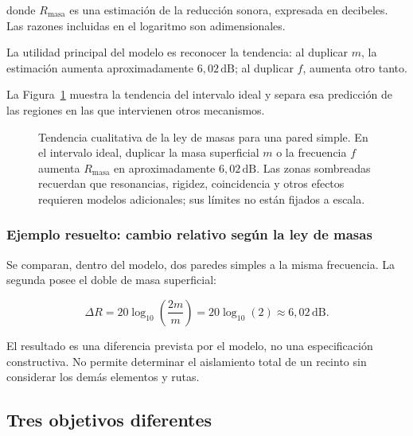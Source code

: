 donde \(R_\mathrm{masa}\) es una estimación de la reducción sonora, expresada
en decibeles. Las razones incluidas en el logaritmo son adimensionales.

La utilidad principal del modelo es reconocer la tendencia: al duplicar
\(m\), la estimación aumenta aproximadamente \(6{,}02\,\text{dB}\); al
duplicar \(f\), aumenta otro tanto.


La Figura~\ref{fig:u9-ley-masas} muestra la tendencia del intervalo ideal y
separa esa predicción de las regiones en las que intervienen otros
mecanismos.

\begin{figure}[!t]
    \centering
    
    \caption{Tendencia cualitativa de la ley de masas para una pared simple.
    En el intervalo ideal, duplicar la masa superficial \(m\) o la frecuencia
    \(f\) aumenta \(R_\mathrm{masa}\) en aproximadamente
    \(6{,}02\,\text{dB}\). Las zonas sombreadas recuerdan que resonancias,
    rigidez, coincidencia y otros efectos requieren modelos adicionales; sus
    límites no están fijados a escala.}
    \label{fig:u9-ley-masas}
\end{figure}

\subsubsection*{Ejemplo resuelto: cambio relativo según la ley de masas}

Se comparan, dentro del modelo, dos paredes simples a la misma frecuencia. La
segunda posee el doble de masa superficial:

\[
    \Delta R
      =20\log_{10}\!\left(\frac{2m}{m}\right)
      =20\log_{10}(2)
      \approx6{,}02\,\text{dB}.
\]

El resultado es una diferencia prevista por el modelo, no una especificación
constructiva. No permite determinar el aislamiento total de un recinto sin
considerar los demás elementos y rutas.

\subsection{Tres objetivos diferentes}
\label{sec:u9-acondicionamiento-insonorizacion}

